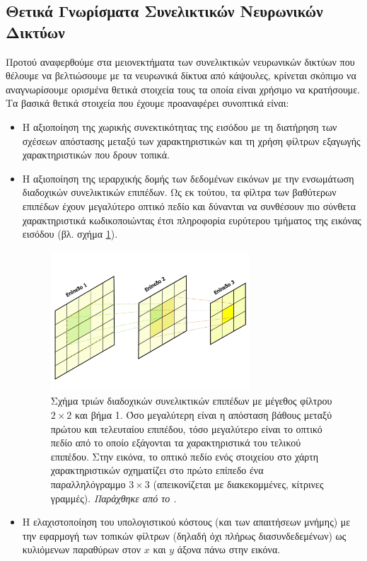 \subsection{Θετικά Γνωρίσματα Συνελικτικών Νευρωνικών Δικτύων}
\label{sec:positives_of_cnns}
Προτού αναφερθούμε στα μειονεκτήματα των συνελικτικών νευρωνικών δικτύων που θέλουμε να βελτιώσουμε με τα νευρωνικά δίκτυα από κάψουλες, κρίνεται σκόπιμο να αναγνωρίσουμε ορισμένα θετικά στοιχεία τους τα οποία είναι χρήσιμο να κρατήσουμε. Τα βασικά θετικά στοιχεία που έχουμε προαναφέρει συνοπτικά είναι:
\begin{itemize}
\item Η αξιοποίηση της χωρικής συνεκτικότητας της εισόδου με τη διατήρηση των σχέσεων απόστασης μεταξύ των χαρακτηριστικών και τη χρήση φίλτρων εξαγωγής χαρακτηριστικών που δρουν τοπικά.
\item Η αξιοποίηση της ιεραρχικής δομής των δεδομένων εικόνων με την ενσωμάτωση διαδοχικών συνελικτικών επιπέδων. Ως εκ τούτου, τα φίλτρα των βαθύτερων επιπέδων έχουν μεγαλύτερο οπτικό πεδίο και δύνανται να συνθέσουν πιο σύνθετα χαρακτηριστικά κωδικοποιώντας έτσι πληροφορία ευρύτερου τμήματος της εικόνας εισόδου (βλ. σχήμα \ref{fig:fov}).
\begin{figure}[h]
  \centering
  \includegraphics[width=0.7\textwidth]{images/chapter theoritical background/FOV_gr.pdf}
  \caption{Σχήμα τριών διαδοχικών συνελικτικών επιπέδων με μέγεθος φίλτρου $2\times2$ και βήμα 1. Όσο μεγαλύτερη είναι η απόσταση βάθους μεταξύ πρώτου και τελευταίου επιπέδου, τόσο μεγαλύτερο είναι το οπτικό πεδίο από το οποίο εξάγονται τα χαρακτηριστικά του τελικού επιπέδου. Στην εικόνα, το οπτικό πεδίο ενός στοιχείου στο χάρτη χαρακτηριστικών  σχηματίζει στο πρώτο επίπεδο ένα παραλληλόγραμμο $3\times3$ (απεικονίζεται με διακεκομμένες, κίτρινες γραμμές). \textit{Παράχθηκε από το \href{https://inkscape.org/}{}.}} 
  \label{fig:fov}
\end{figure} 

\item Η ελαχιστοποίηση του υπολογιστικού κόστους (και των απαιτήσεων μνήμης) με την εφαρμογή των τοπικών φίλτρων (δηλαδή όχι πλήρως διασυνδεδεμένων) ως κυλιόμενων παραθύρων στον $x$ και $y$ άξονα πάνω στην εικόνα.
\end{itemize}
